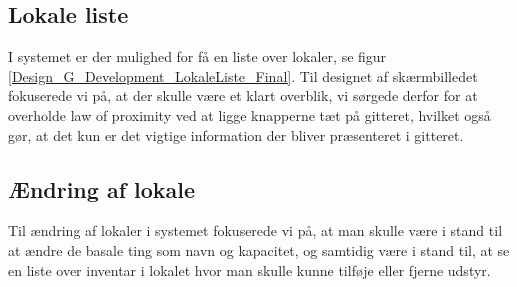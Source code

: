 \subsection{Lokale liste}
I systemet er der mulighed for få en liste over lokaler, se figur \ref{Design_G_Development_LokaleListe_Final}. Til designet af skærmbilledet fokuserede vi på, at der skulle være et  klart overblik, vi sørgede derfor for at overholde law of proximity ved at ligge knapperne tæt på gitteret, hvilket også gør, at det kun er det vigtige information der bliver præsenteret i gitteret.

\subsection{Ændring af lokale}
Til ændring af lokaler i systemet fokuserede vi på, at man skulle være i stand til at ændre de basale ting som navn og kapacitet, og samtidig være i stand til, at se en liste over inventar i lokalet hvor man skulle kunne tilføje eller fjerne udstyr.


